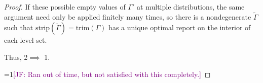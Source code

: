 \documentclass[12pt]{article}
\newcommand{\Comments}{1}
\newcommand{\mynote}[2]{\ifnum\Comments=1\textcolor{#1}{#2}\fi}
\newcommand{\jessie}[1]{\mynote{purple}{[JF: #1]}}
\newcommand{\E}{\mathbb{E}}
\newcommand{\R}{\mathcal{R}}
\newcommand{\inter}[1]{\mathring{#1}}%
\newcommand{\trim}{\mathrm{trim}}
\newcommand{\strip}{\text{strip}}
\begin{document}
\begin{proof}
If these possible empty values of $\Gamma'$ at multiple distributions, the same argument need only be applied finitely many times, so there is a nondegenerate $\tilde \Gamma$ such that $\strip(\tilde \Gamma) = \trim(\Gamma)$ has a unique optimal report on the interior of each level set.


Thus, 2$\implies$ 1.

\jessie{Ran out of time, but not satisfied with this completely.}


%
%

\end{proof}
\end{document}
